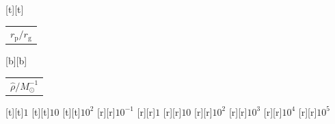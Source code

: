 %    
%
%
\begin{psfrags}%
\psfragscanon%
%
[t][t]{\color[rgb]{0,0,0}\setlength{\tabcolsep}{0pt}\begin{tabular}{c}{\Large$r_\mathrm{p}/r_\mathrm{g}$}\end{tabular}}%
[b][b]{\color[rgb]{0,0,0}\setlength{\tabcolsep}{0pt}\begin{tabular}{c}{\Large$\hat{\rho}/M_\odot^{-1}$}\end{tabular}}%
%
[t][t]{$1$}%
[t][t]{$10$}%
[t][t]{$10^{2}$}%
%
[r][r]{$10^{-1}$}%
[r][r]{$1$}%
[r][r]{$10$}%
[r][r]{$10^{2}$}%
[r][r]{$10^{3}$}%
[r][r]{$10^{4}$}%
[r][r]{$10^{5}$}%
%
%
\end{psfrags}%
%
